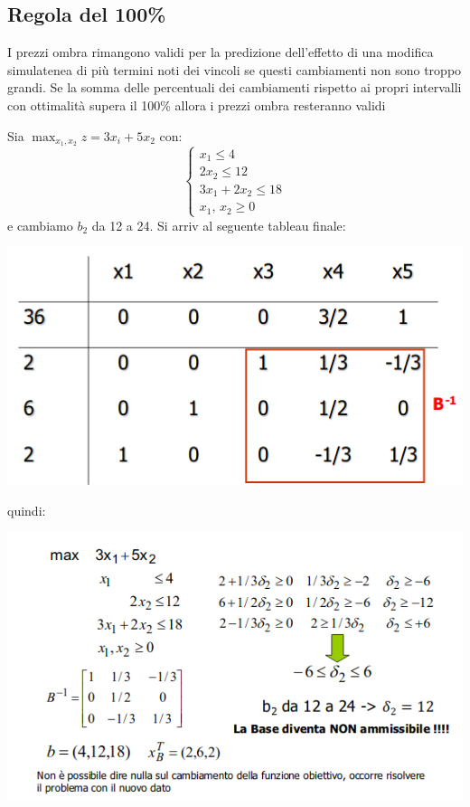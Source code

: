 \documentclass[a4paper,12pt, oneside]{book}
\begin{document}
\subsection{Regola del 100\%}
\begin{definizione}
  I prezzi ombra rimangono validi per la predizione dell'effetto di
  una modifica simulatenea di più termini noti dei vincoli se questi
  cambiamenti non sono troppo grandi. Se la somma delle percentuali
  dei cambiamenti rispetto ai propri intervalli con ottimalità supera
  il 100\% allora i prezzi ombra resteranno validi
\end{definizione}
\begin{esempio}
  Sia $\max_{x_1,x_2}z=3x_i+5x_2$ con:
  \[
    \begin{cases}
      x_1\leq 4\\
      2x_2\leq 12\\
      3x_1+2x_2\leq 18\\
      x_1,\,x_2\geq 0
    \end{cases}
  \]
  e cambiamo $b_2$ da 12 a 24. Si arriv al seguente tableau finale:
  \begin{center}
    \includegraphics[scale = 0.7]{img/add2.png}
  \end{center}
  quindi:
  \begin{center}
    \includegraphics[scale = 0.7]{img/add3.png}

\end{center}
\end{esempio}
\end{document}
